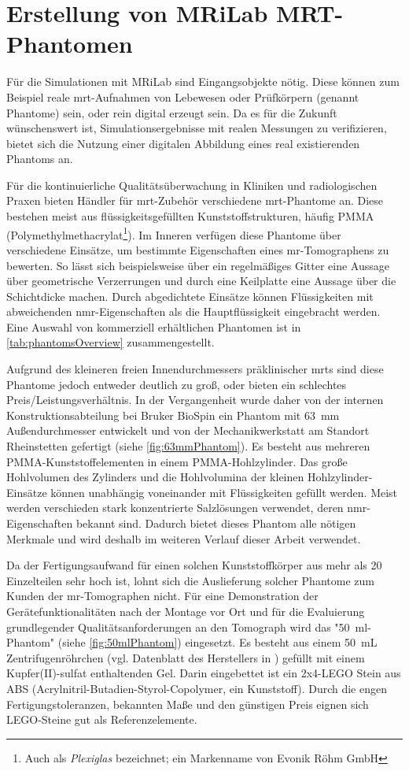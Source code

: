 \clearpage
\section{Erstellung von MRiLab MRT-Phantomen}
Für die Simulationen mit MRiLab sind Eingangsobjekte nötig. Diese können zum Beispiel reale \gls{mrt}-Aufnahmen von Lebewesen oder Prüfkörpern (genannt Phantome) sein, oder rein digital erzeugt sein. Da es für die Zukunft wünschenswert ist, Simulationsergebnisse mit realen Messungen zu verifizieren, bietet sich die Nutzung einer digitalen Abbildung eines real existierenden Phantoms an.

Für die kontinuierliche Qualitätsüberwachung in Kliniken und radiologischen Praxen bieten Händler für \gls{mrt}-Zubehör verschiedene \gls{mrt}-Phantome an. Diese bestehen meist aus flüssigkeitsgefüllten Kunststoffstrukturen, häufig PMMA (Polymethylmethacrylat\footnote{Auch als \textit{Plexiglas} bezeichnet; ein Markenname von Evonik Röhm GmbH}). Im Inneren verfügen diese Phantome über verschiedene Einsätze, um bestimmte Eigenschaften eines \gls{mr}-Tomographens zu bewerten. So lässt sich beispielsweise über ein regelmäßiges Gitter eine Aussage über geometrische Verzerrungen und durch eine Keilplatte eine Aussage über die Schichtdicke machen. Durch abgedichtete Einsätze können Flüssigkeiten mit abweichenden \gls{nmr}-Eigenschaften als die Hauptflüssigkeit eingebracht werden. Eine Auswahl von kommerziell erhältlichen Phantomen ist in \autoref{tab:phantomsOverview} zusammengestellt.

Aufgrund des kleineren freien Innendurchmessers präklinischer \gls{mrt}s sind diese Phantome jedoch entweder deutlich zu groß, oder bieten ein schlechtes Preis/Leistungsverhältnis. In der Vergangenheit wurde daher von der internen Konstruktionsabteilung bei Bruker BioSpin ein Phantom mit \SI{63}{\mm} Außendurchmesser entwickelt und von der Mechanikwerkstatt am Standort Rheinstetten gefertigt (siehe \autoref{fig:63mmPhantom}). Es besteht aus mehreren PMMA-Kunststoffelementen in einem PMMA-Hohlzylinder. Das große Hohlvolumen des Zylinders und die Hohlvolumina der kleinen Hohlzylinder-Einsätze können unabhängig voneinander mit Flüssigkeiten gefüllt werden. Meist werden verschieden stark konzentrierte Salzlösungen verwendet, deren \gls{nmr}-Eigenschaften bekannt sind. Dadurch bietet dieses Phantom alle nötigen Merkmale und wird deshalb im weiteren Verlauf dieser Arbeit verwendet.

 Da der Fertigungsaufwand für einen solchen Kunststoffkörper aus mehr als 20 Einzelteilen sehr hoch ist, lohnt sich die Auslieferung solcher Phantome zum Kunden der \gls{mr}-Tomographen nicht. Für eine Demonstration der Gerätefunktionalitäten nach der Montage vor Ort und für die Evaluierung grundlegender Qualitätsanforderungen an den Tomograph wird das "50~ml-Phantom" (siehe \autoref{fig:50mlPhantom}) eingesetzt. Es besteht aus einem \SI{50}{\milli\liter} Zentrifugenröhrchen (vgl. Datenblatt des Herstellers in \cite{corningCentriStar}) gefüllt mit einem Kupfer(II)-sulfat enthaltenden Gel. Darin eingebettet ist ein 2x4-LEGO Stein aus ABS (Acrylnitril-Butadien-Styrol-Copolymer, ein Kunststoff). Durch die engen Fertigungstoleranzen, bekannten Maße und den günstigen Preis eignen sich LEGO-Steine gut als Referenzelemente.

